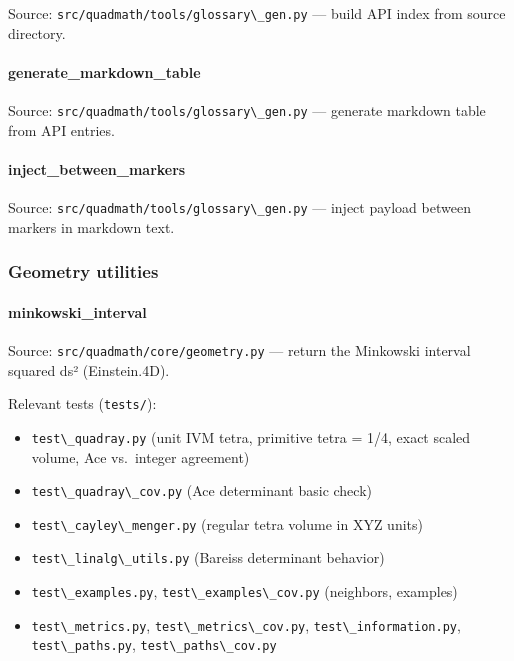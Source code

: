 \documentclass[
  10pt,
]{article}
\newcommand{\passthrough}[1]{#1}
\providecommand{\tightlist}{%
  \setlength{\itemsep}{0pt}\setlength{\parskip}{0pt}}
\renewcommand{\texttt}[1]{%
    \colorbox{codebg}{\color{codefg}\ttfamily #1}%
}
\begin{document}
Source: \passthrough{\lstinline!src/quadmath/tools/glossary\_gen.py!}
--- build API index from source directory.

\paragraph{\texorpdfstring{\texttt{generate\_markdown\_table}}{generate\_markdown\_table}}\label{code:generate_markdown_table}

Source: \passthrough{\lstinline!src/quadmath/tools/glossary\_gen.py!}
--- generate markdown table from API entries.

\paragraph{\texorpdfstring{\texttt{inject\_between\_markers}}{inject\_between\_markers}}\label{code:inject_between_markers}

Source: \passthrough{\lstinline!src/quadmath/tools/glossary\_gen.py!}
--- inject payload between markers in markdown text.

\subsubsection{Geometry utilities}\label{code:geometry}

\paragraph{\texorpdfstring{\texttt{minkowski\_interval}}{minkowski\_interval}}\label{code:minkowski_interval}

Source: \passthrough{\lstinline!src/quadmath/core/geometry.py!} ---
return the Minkowski interval squared ds² (Einstein.4D).

Relevant tests (\passthrough{\lstinline!tests/!}):

\begin{itemize}
\tightlist
\item
  \passthrough{\lstinline!test\_quadray.py!} (unit IVM tetra, primitive
  tetra = 1/4, exact scaled volume, Ace vs.~integer agreement)
\item
  \passthrough{\lstinline!test\_quadray\_cov.py!} (Ace determinant basic
  check)
\item
  \passthrough{\lstinline!test\_cayley\_menger.py!} (regular tetra
  volume in XYZ units)
\item
  \passthrough{\lstinline!test\_linalg\_utils.py!} (Bareiss determinant
  behavior)
\item
  \passthrough{\lstinline!test\_examples.py!},
  \passthrough{\lstinline!test\_examples\_cov.py!} (neighbors, examples)
\item
  \passthrough{\lstinline!test\_metrics.py!},
  \passthrough{\lstinline!test\_metrics\_cov.py!},
  \passthrough{\lstinline!test\_information.py!},
  \passthrough{\lstinline!test\_paths.py!},
  \passthrough{\lstinline!test\_paths\_cov.py!}
\end{itemize}
\end{document}
